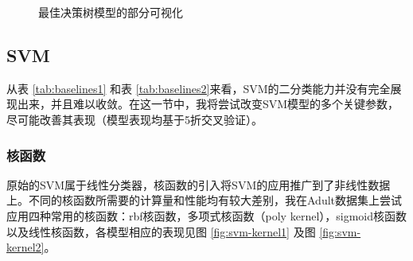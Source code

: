 \documentclass[12pt,a4paper]{article}
\theoremstyle{definition}
\begin{document}
{\begin{figure}[H]
	\centering
	\caption{最佳决策树模型的部分可视化}
	\label{fig:dt-best-vis}
\end{figure}

\subsection{SVM}

从表 \ref{tab:baselines1} 和表 \ref{tab:baselines2}来看，SVM的二分类能力并没有完全展现出来，并且难以收敛。在这一节中，我将尝试改变SVM模型的多个关键参数，尽可能改善其表现（模型表现均基于5折交叉验证）。

\subsubsection{核函数}

原始的SVM属于线性分类器，核函数的引入将SVM的应用推广到了非线性数据上。不同的核函数所需要的计算量和性能均有较大差别，我在Adult数据集上尝试应用四种常用的核函数：rbf核函数，多项式核函数（poly kernel），sigmoid核函数以及线性核函数，各模型相应的表现见图 \ref{fig:svm-kernel1} 及图 \ref{fig:svm-kernel2}。

}
\end{document}
